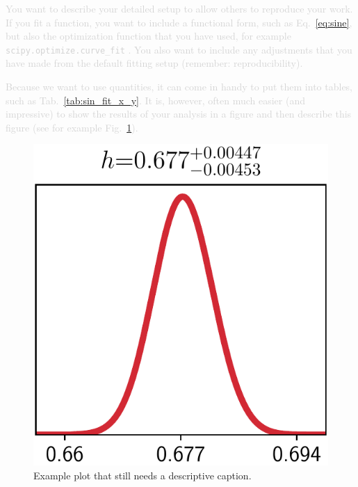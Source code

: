 \documentclass[twocolumn,apj,numberedappendix,appendixfloats]{openjournal}
\newcommand{\comment}[1]{\textcolor{lightgray}{#1}}
\begin{document}
\comment{You want to describe your detailed setup to allow others to reproduce your work. If you fit a function, you want to include a functional form, such as Eq.~\ref{eq:sine}, but also the optimization function that you have used, for example \texttt{scipy.optimize.curve\_fit} \citep{Scipy}. You also want to include any adjustments that you have made from the default fitting setup (remember: reproducibility).}

\comment{Because we want to use quantities, it can come in handy to put them into tables, such as Tab.~\ref{tab:sin_fit_x_y}. It is, however, often much easier (and impressive) to show the results of your analysis in a figure and then describe this figure (see for example Fig.~\ref{fig:fig}).}




\begin{center}
    \begin{figure}[!t]
        \centering
    	\includegraphics[scale=0.3]{figures/probdist.png}
    	\caption{Example plot that still needs a descriptive caption.}
        \label{fig:fig}
    \end{figure}
\end{center}
\end{document}
